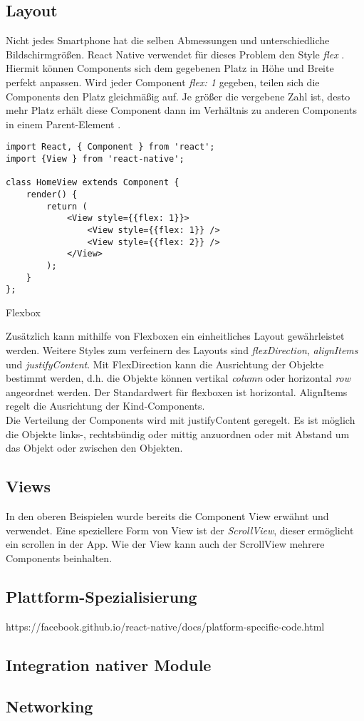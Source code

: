 \subsection{Layout}
Nicht jedes Smartphone hat die selben Abmessungen und unterschiedliche Bildschirmgrößen. React Native verwendet für dieses Problem den Style \textit{flex} \cite{facebook_inc._flex_2017}.  Hiermit können Components sich dem gegebenen Platz in Höhe und Breite perfekt anpassen. Wird jeder Component \textit{flex: 1} gegeben, teilen sich die Components den Platz gleichmäßig auf. Je größer die vergebene Zahl ist, desto mehr Platz erhält diese Component dann im Verhältnis zu anderen Components in einem Parent-Element \cite{facebook_inc._flex_2017}. 

\begin{listing}[H]
    \begin{verbatim}
import React, { Component } from 'react';
import {View } from 'react-native';

class HomeView extends Component {
    render() {
        return (
            <View style={{flex: 1}}>
                <View style={{flex: 1}} />
                <View style={{flex: 2}} />
            </View>
        );
    }
};

    \end{verbatim}
    \caption{Flexbox}
    \label{lst:flex}
\end{listing}

Zusätzlich kann mithilfe von Flexboxen ein einheitliches Layout gewährleistet werden. Weitere Styles zum verfeinern des Layouts sind \textit{flexDirection}, \textit{alignItems} und \textit{justifyContent}. Mit FlexDirection kann die Ausrichtung der Objekte bestimmt werden, d.h. die Objekte können vertikal \textit{column} oder horizontal \textit{row} angeordnet werden. Der Standardwert für flexboxen ist horizontal. AlignItems regelt die Ausrichtung der Kind-Components. \\

Die Verteilung der Components wird mit justifyContent geregelt. Es ist möglich die Objekte links-, rechtsbündig oder mittig anzuordnen oder mit Abstand um das Objekt oder zwischen den Objekten. 


\subsection{Views}
In den oberen Beispielen wurde bereits die Component View erwähnt und verwendet. Eine speziellere Form von View ist der \textit{ScrollView}, dieser ermöglicht ein scrollen in der App. Wie der View kann auch der ScrollView mehrere Components beinhalten. 

\subsection{Plattform-Spezialisierung}
https://facebook.github.io/react-native/docs/platform-specific-code.html

\subsection{Integration nativer Module}

\subsection{Networking}
